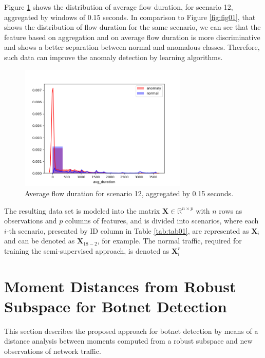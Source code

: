 \documentclass[review]{elsarticle}
\begin{document}
Figure \ref{fig:fig02} shows the distribution of average flow duration, for scenario 12, aggregated by windows of 0.15 seconds. In comparison to Figure \ref{fig:fig01}, that shows the distribution of flow duration for the same scenario, we can see that the feature based on aggregation and on average flow duration is more discriminative and shows a better separation between normal and anomalous classes. Therefore, such data can improve the anomaly detection by learning algorithms.

\begin{figure}[h!]
     \centering
     \includegraphics[width=8cm]{figures/agg_distplot_0_15s_12_avg_duration.png}
     \caption{Average flow duration for scenario 12, aggregated by 0.15 seconds.}
     \label{fig:fig02}
\end{figure}

The resulting data set is modeled into the matrix $\boldsymbol{X} \in \mathbb{R}^{n \times p}$ with $n$ rows as observations and $p$ columns of features, and is divided into scenarios, where each $i$-th scenario, presented by ID column in Table \ref{tab:tab01}, are represented as $\boldsymbol{X}_i$ and can be denoted as $\boldsymbol{X}_{18-2}$, for example. The normal traffic, required for training the semi-supervised approach, is denoted as $\boldsymbol{X}_i^r$

\section{Moment Distances from Robust Subspace for Botnet Detection}
\label{sec:mdrs}

This section describes the proposed approach for botnet detection by means of a distance analysis between moments computed from a robust subspace and new observations of network traffic. 
\end{document}
